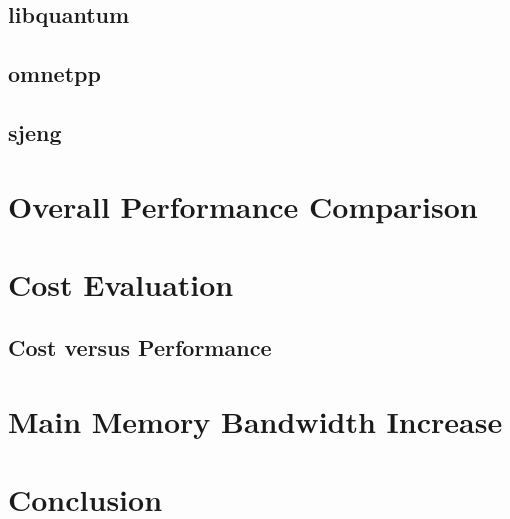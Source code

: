 \documentclass[11pt,titlepage]{article}
\begin{document}
    \subsection{libquantum}

    \subsection{omnetpp}

    \subsection{sjeng}

\section{Overall Performance Comparison}

\section{Cost Evaluation}

    \subsection{Cost versus Performance}

\section{Main Memory Bandwidth Increase}

\section{Conclusion}
\end{document}
